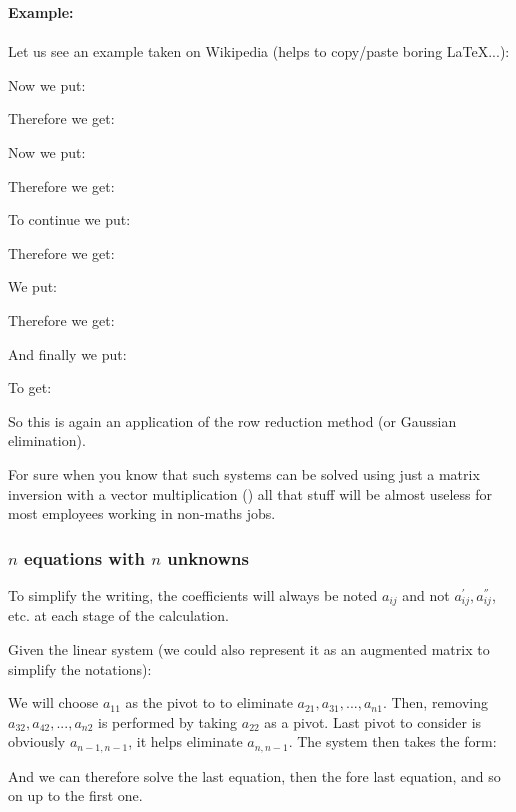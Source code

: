 		\begin{tcolorbox}[colframe=black,colback=white,sharp corners]
		\textbf{{\Large {}}Example:}\\\\
		Let us see an example taken on Wikipedia (helps to copy/paste boring \LaTeX ...):
		
		Now we put:
		
		Therefore we get:
		
		Now we put:
		
		Therefore we get:
		
		\end{tcolorbox}
		\begin{tcolorbox}[colframe=black,colback=white,sharp corners]
		To continue we put:
		
		Therefore we get:
		
		We put:
		
		Therefore we get:
		
		And finally we put:
		
		To get:
		
		So this is again an application of the row reduction method (or Gaussian elimination).
	\end{tcolorbox}
	For sure when you know that such systems can be solved using just a matrix inversion with a vector multiplication () all that stuff will be almost useless for most employees working in non-maths jobs.

		\pagebreak
		\subsubsection{$n$ equations with $n$ unknowns}
	
		To simplify the writing, the coefficients will always be noted $a_{ij}$ and not $a_{ij}^{'},a_{ij}^{''}$, etc. at each stage of the calculation.
		
		Given the linear system (we could also represent it as an augmented matrix to simplify the notations):
		
We will choose $a_{11}$ as the pivot to to eliminate $a_{21},a_{31},...,a_{n1}$. Then, removing $a_{32},a_{42},...,a_{n2}$ is performed by taking $a_{22}$ as a pivot. Last pivot to consider is obviously $a_{n-1,n-1}$, it helps eliminate $a_{n,n-1}$. The system then takes the form:
		
		And we can therefore solve the last equation, then the fore last equation, and so on up to the first one.
		
